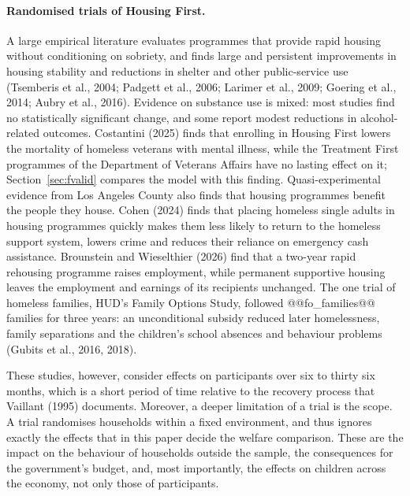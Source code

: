 \documentclass[10pt]{article}
\begin{document}
\paragraph{Randomised trials of Housing First.} A large empirical literature
evaluates programmes that provide rapid housing without conditioning on sobriety,
and finds large and persistent improvements in housing stability and reductions in
shelter and other public-service use (Tsemberis et al., 2004; Padgett et al., 2006; Larimer et al., 2009; Goering et al., 2014; Aubry et
al., 2016). Evidence on substance use is mixed: most studies find no statistically
significant change, and some report modest reductions in alcohol-related outcomes. Costantini (2025) finds that enrolling in Housing First lowers the mortality of homeless veterans with mental illness, while the Treatment First programmes of the Department of Veterans Affairs have no lasting effect on it; Section~\ref{sec:fvalid} compares the model with this finding.  Quasi-experimental evidence from Los Angeles County also finds that housing programmes benefit the people they house. Cohen (2024) finds that placing homeless single adults in housing programmes quickly makes them less likely
to return to the homeless support system, lowers crime and reduces their reliance on emergency cash assistance.
Brounstein and Wieselthier (2026) find that a two-year rapid rehousing programme raises employment, while permanent
supportive housing leaves the employment and earnings of its recipients unchanged. The one trial of homeless families, HUD's Family Options Study, followed @@fo_families@@ families for three years: an unconditional subsidy reduced later homelessness, family separations and the children's school absences and behaviour problems (Gubits et al., 2016, 2018).

 These studies, however, consider effects on participants over six to thirty six months, which is a short period of time relative to the recovery process that Vaillant (1995) documents. Moreover, a deeper limitation of a trial is the scope. A trial randomises households within a fixed environment, and thus ignores exactly the effects that in this paper decide the welfare comparison. These are the impact on the behaviour of households outside the sample, the consequences for the government's budget, and, most importantly, the effects on children across the economy, not only those of participants.
\end{document}
